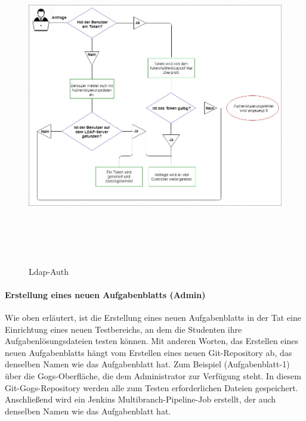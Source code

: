 \documentclass[apaper4,12p]{scrartcl}
\begin{document}
\begin{figure}[h!]
	\begin{center}
		\includegraphics[width=17.5cm, height=14cm]{Ldap-Auth.jpg}
		\caption{Ldap-Auth } 
		\label{ Ldap-Auth } 
	\end{center}
\end{figure}

\paragraph{Erstellung eines neuen Aufgabenblatts (Admin)}
Wie oben erläutert, ist die Erstellung eines neuen Aufgabenblatts in der Tat eine Einrichtung eines neuen Testbereichs, an dem die Studenten ihre Aufgabenlösungsdateien testen können. Mit anderen Worten, das Erstellen eines neuen Aufgabenblatts hängt vom Erstellen eines neuen Git-Repository ab, das denselben Namen wie das Aufgabenblatt hat. Zum Beispiel (Aufgabenblatt-1) über die Gogs-Oberfläche, die dem Administrator zur Verfügung steht. In diesem Git-Gogs-Repository werden alle zum Testen erforderlichen Dateien gespeichert. Anschließend wird ein Jenkins Multibranch-Pipeline-Job erstellt, der auch denselben Namen wie das Aufgabenblatt hat.
\end{document}
